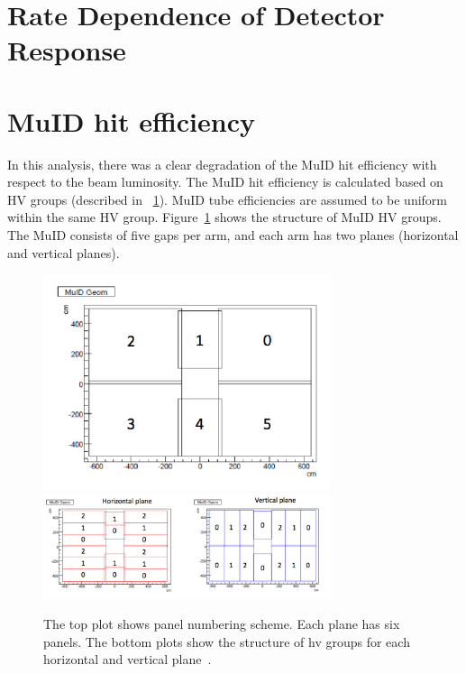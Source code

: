 \section{Rate Dependence of Detector Response}

\section{MuID hit efficiency}
In this analysis, there was a clear degradation of the MuID hit efficiency with
respect to the beam luminosity. The MuID hit efficiency is calculated based on
HV groups (described in ~\ref{Fig:efficiency:MuidEff:hvgroup}). MuID tube
efficiencies are assumed to be uniform within the same HV group.
Figure~\ref{Fig:efficiency:MuidEff:hvgroup} shows the structure of MuID HV
groups. The MuID consists of five gaps per arm, and each arm has two planes
(horizontal and vertical planes).

\begin{figure}[ht]
  \centering
  \includegraphics[width=0.75\textwidth]{./figures/muid_panel_structure.pdf}
  \includegraphics[width=0.75\textwidth]{./figures/muid_hv_group.pdf}
  \caption{
    The top plot shows panel numbering scheme. Each plane has six panels. The
    bottom plots show the structure of hv groups for each horizontal and
    vertical plane~\cite{Seidl2014}.
  }
  \label{Fig:efficiency:MuidEff:hvgroup}
\end{figure}

